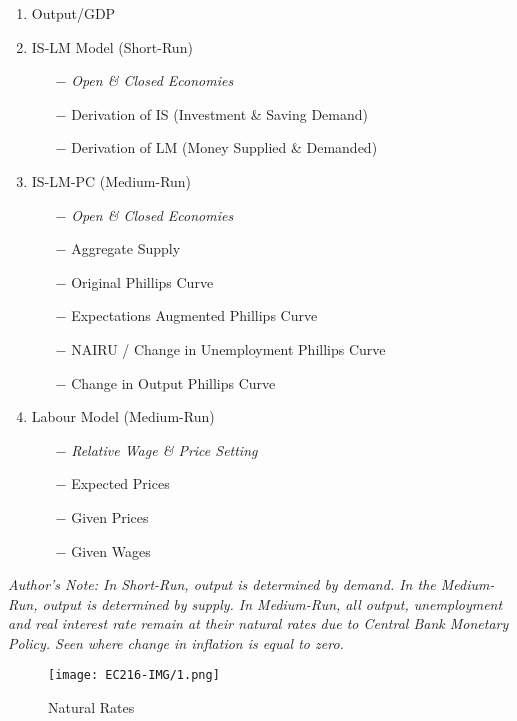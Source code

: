 \documentclass[11pt, english]{article}
\begin{document}
	\begin{enumerate}                                                                   
        \setlength\itemsep{0cm}
                \item Output/GDP
		\item IS-LM Model (Short-Run)
		\begin{itemize}
			\item[$-$] \textit{Open \& Closed Economies}
			\item[$-$] Derivation of IS (Investment \& Saving Demand)
			\item[$-$] Derivation of LM (Money Supplied \& Demanded)
		\end{itemize}
		\item IS-LM-PC (Medium-Run)
		\begin{itemize}
			\item[$-$] \textit{Open \& Closed Economies}
			\item[$-$] Aggregate Supply
			\item[$-$] Original Phillips Curve
			\item[$-$] Expectations Augmented Phillips Curve
			\item[$-$] NAIRU / Change in Unemployment Phillips Curve
			\item[$-$] Change in Output Phillips Curve
		\end{itemize}
		\item Labour Model (Medium-Run)
		\begin{itemize}
			\item[$-$] \textit{Relative Wage \& Price Setting}
			\item[$-$] Expected Prices
			\item[$-$] Given Prices
			\item[$-$] Given Wages
		\end{itemize}
        \end{enumerate}

	\newpage

	\textit{Author's Note: In Short-Run, output is determined by demand. In the Medium-Run, output is determined by supply. In Medium-Run, all output, unemployment and real interest rate remain at their natural rates due to Central Bank Monetary Policy. Seen where change in inflation is equal to zero.}

	\begin{figure}[H]
	\begin{center}
		\texttt{[image: EC216-IMG/1.png]}
	\end{center}
		\caption{Natural Rates}
	\end{figure}
\end{document}
